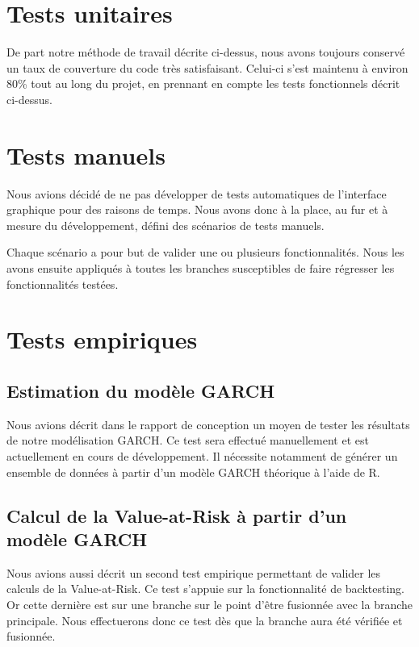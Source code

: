 \documentclass[a4paper,titlepage,french]{report}
\begin{document}
\section{Tests unitaires}

De part notre méthode de travail décrite ci-dessus, nous avons toujours conservé un taux de couverture du code très satisfaisant.
Celui-ci s'est maintenu à environ 80\% tout au long du projet, en prennant en compte les tests fonctionnels décrit ci-dessus.


\section{Tests manuels}

Nous avions décidé de ne pas développer de tests automatiques de l'interface graphique pour des raisons de temps.
Nous avons donc à la place, au fur et à mesure du développement, défini des scénarios de tests manuels.

Chaque scénario a pour but de valider une ou plusieurs fonctionnalités.
Nous les avons ensuite appliqués à toutes les branches susceptibles de faire régresser les fonctionnalités testées.


\section{Tests empiriques}

\subsection{Estimation du modèle GARCH}

Nous avions décrit dans le rapport de conception un moyen de tester les résultats de notre modélisation GARCH.
Ce test sera effectué manuellement et est actuellement en cours de développement.
Il nécessite notamment de générer un ensemble de données à partir d'un modèle GARCH théorique à l'aide de R.


\subsection{Calcul de la Value-at-Risk à partir d'un modèle GARCH}

Nous avions aussi décrit un second test empirique permettant de valider les calculs de la Value-at-Risk.
Ce test s'appuie sur la fonctionnalité de backtesting.
Or cette dernière est sur une branche sur le point d'être fusionnée avec la branche principale.
Nous effectuerons donc ce test dès que la branche aura été vérifiée et fusionnée.
\end{document}
